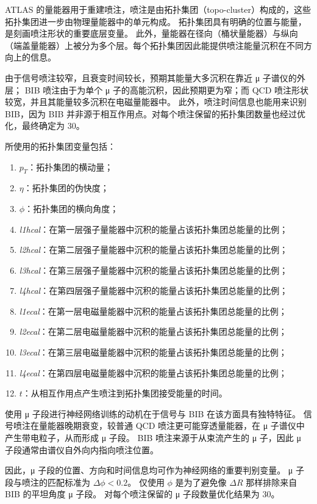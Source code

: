 ATLAS 的量能器用于重建喷注，喷注是由拓扑集团（topo-cluster）构成的，这些拓扑集团进一步由物理量能器中的单元构成。
拓扑集团具有明确的位置与能量，是刻画喷注形状的重要底层变量。
此外，量能器在径向（桶状量能器）与纵向（端盖量能器）上被分为多个层。每个拓扑集团因此能提供喷注能量沉积在不同方向上的信息。

由于信号喷注较窄，且衰变时间较长，预期其能量大多沉积在靠近 μ 子谱仪的外层；
BIB 喷注由于为单个 μ 子的高能沉积，因此预期更为窄；而 QCD 喷注形状较宽，并且其能量较多沉积在电磁量能器中。
此外，喷注时间信息也能用来识别 BIB，因为 BIB 并非源于相互作用点。对每个喷注保留的拓扑集团数量也经过优化，最终确定为 30。

所使用的拓扑集团变量包括：
\begin{enumerate}
      \item $p_T$：拓扑集团的横动量；
      \item $\eta$：拓扑集团的伪快度；
      \item $\phi$：拓扑集团的横向角度；
      \item \textit{l1hcal}：在第一层强子量能器中沉积的能量占该拓扑集团总能量的比例；
      \item \textit{l2hcal}：在第二层强子量能器中沉积的能量占该拓扑集团总能量的比例；
      \item \textit{l3hcal}：在第三层强子量能器中沉积的能量占该拓扑集团总能量的比例；
      \item \textit{l4hcal}：在第四层强子量能器中沉积的能量占该拓扑集团总能量的比例；
      \item \textit{l1ecal}：在第一层电磁量能器中沉积的能量占该拓扑集团总能量的比例；
      \item \textit{l2ecal}：在第二层电磁量能器中沉积的能量占该拓扑集团总能量的比例；
      \item \textit{l3ecal}：在第三层电磁量能器中沉积的能量占该拓扑集团总能量的比例；
      \item \textit{l4ecal}：在第四层电磁量能器中沉积的能量占该拓扑集团总能量的比例；
      \item $t$：从相互作用点产生喷注到拓扑集团接受能量的时间。
\end{enumerate}

使用 μ 子段进行神经网络训练的动机在于信号与 BIB 在该方面具有独特特征。
信号喷注在量能器晚期衰变，较普通 QCD 喷注更可能穿透量能器，在 μ 子谱仪中产生带电粒子，从而形成 μ 子段。
BIB 喷注来源于从束流产生的 μ 子，因此 μ 子段通常由谱仪自外向内指向喷注位置。

因此，μ 子段的位置、方向和时间信息均可作为神经网络的重要判别变量。
μ 子段与喷注的匹配标准为 $\Delta \phi < 0.2$。
仅使用 $\phi$ 是为了避免像 $\Delta R$ 那样排除来自 BIB 的平坦角度 μ 子段。
对每个喷注保留的 μ 子段数量优化结果为 30。

